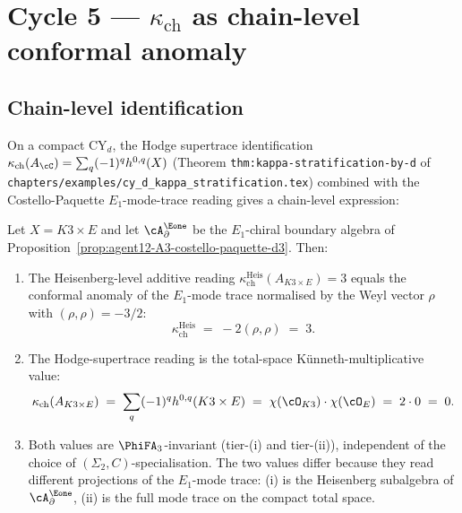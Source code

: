 \section{Cycle 5 --- $\kappa_{\mathrm{ch}}$ as chain-level conformal anomaly}
\label{sec:agent12-kappa-conformal-anomaly}

\subsection*{Chain-level identification}

On a compact CY$_d$, the Hodge supertrace identification
$\kappa_{\mathrm{ch}}(A_\cC) = \sum_q (-1)^q h^{0,q}(X)$ (Theorem
\texttt{thm:kappa-stratification-by-d} of
\texttt{chapters/examples/cy\_d\_kappa\_stratification.tex}) combined
with the Costello-Paquette $E_1$-mode-trace reading gives a
chain-level expression:

\begin{proposition}
\label{prop:agent12-A5-kappa-mode-anomaly}
\ClaimStatusProvedHere
Let $X = K3 \times E$ and let $\cA^{\Eone}_\partial$ be the $E_1$-chiral
boundary algebra of Proposition~\ref{prop:agent12-A3-costello-paquette-d3}.
Then:
\begin{enumerate}[label=\textup{(\roman*)}]
\item The Heisenberg-level additive reading
$\kappa_{\mathrm{ch}}^{\mathrm{Heis}}(A_{K3 \times E}) = 3$ equals the
conformal anomaly of the $E_1$-mode trace normalised by the Weyl
vector $\rho$ with $(\rho, \rho) = -3/2$:
\[
 \kappa_{\mathrm{ch}}^{\mathrm{Heis}}
 \;=\;
 -2(\rho, \rho)
 \;=\;
 3.
\]
\item The Hodge-supertrace reading is the total-space
K\"unneth-multiplicative value:
\[
 \kappa_{\mathrm{ch}}(A_{K3 \times E})
 \;=\;
 \sum_q (-1)^q h^{0,q}(K3 \times E)
 \;=\;
 \chi(\cO_{K3}) \cdot \chi(\cO_E)
 \;=\;
 2 \cdot 0
 \;=\;
 0.
\]
\item Both values are $\PhiFA_3$-invariant (tier-(i) and tier-(ii)),
independent of the choice of $(\Sigma_2, C)$-specialisation. The
two values differ because they read different projections of the
$E_1$-mode trace: (i) is the Heisenberg subalgebra of
$\cA^{\Eone}_\partial$, (ii) is the full mode trace on the compact
total space.
\end{enumerate}
\end{proposition}

